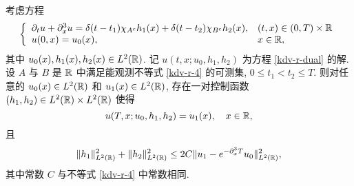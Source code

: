 \begin{theorem}
考虑方程
\begin{equation}
    \left\lbrace\begin{array}{ll}
        \partial_t u +\partial_x^3u=\delta(t-t_1)\chi_{A^c}h_1(x)+\delta(t-t_2)\chi_{B^c}h_2(x), & (t,x)\in (0,T)\times \mathbb{R} \\
        u(0,x)=u_0(x),& x\in \mathbb{R},
    \end{array}\right.\label{kdv-r-dual}
\end{equation}
其中 $u_0(x),h_1(x),h_2(x)\in L^2(\mathbb{R})$. 记 $u(t,x;u_0,h_1,h_2)$ 为方程 \eqref{kdv-r-dual} 的解. 设 $A$ 与 $B$ 是 $\mathbb{R}$ 中满足能观测不等式 \eqref{kdv-r-4} 的可测集, $0\le t_1<t_2\le T$. 
则对任意的 $u_0(x)\in L^2(\mathbb{R})$ 和 $u_1(x)\in L^2(\mathbb{R})$, 存在一对控制函数 $(h_1,h_2)\in L^2(\mathbb{R})\times L^2(\mathbb{R})$ 使得
\begin{equation*}
    u(T,x;u_0,h_1,h_2)=u_1(x), \quad x\in \mathbb{R},
\end{equation*}
且
\begin{equation}
    \|h_1\|^2_{L^2(\mathbb{R})}+\|h_2\|^2_{L^2(\mathbb{R})}\le 2C \|u_1-e^{-\partial_x^3 T}u_0\|^2_{L^2(\mathbb{R})},
\end{equation}
其中常数 $C$ 与不等式 \eqref{kdv-r-4} 中常数相同.
\end{theorem}
